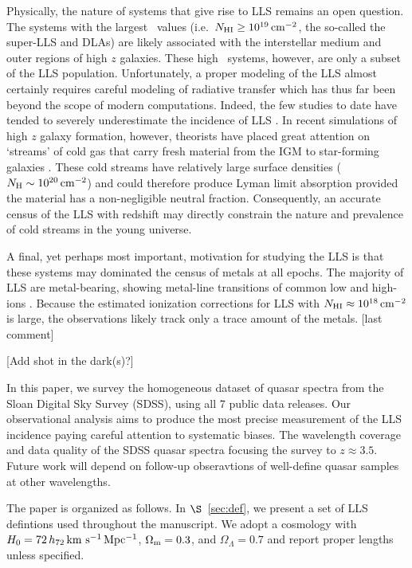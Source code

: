 \documentclass[12pt,preprint]{aastex}
\begin{document}
Physically, the nature of systems that give rise to LLS remains
an open question.  The systems with the largest \nhi\ values
(i.e.\ $N_{\rm HI} \ge 10^{19} \, {\rm cm^{-2}}$, the so-called the super-LLS and
DLAs) are likely associated with the interstellar medium and
outer regions of high $z$ galaxies.  These high \nhi\ systems, however,
are only a subset of the LLS population.  Unfortunately, a proper
modeling of the LLS almost certainly requires careful modeling of 
radiative transfer which has thus far been beyond the scope of
modern computations.  Indeed, the few studies to date have tended
to severely underestimate the incidence of LLS \citep{katz94,gardnerXX,gnedin}.
In recent simulations of high $z$ galaxy formation, however, 
theorists have placed great attention on `streams' of cold gas that
carry fresh material from the IGM to star-forming galaxies 
\citep{keres99,dekel08}.  These cold streams have relatively large
surface densities ($N_{\rm H} \sim 10^{20} \, {\rm cm^{-2}}$) and could therefore
produce Lyman limit absorption provided the material has a
non-negligible neutral fraction.  Consequently, an accurate census
of the LLS with redshift may directly constrain the nature and
prevalence of cold streams in the young universe.

A final, yet perhaps most important, motivation for studying the LLS
is that these systems may dominated the census of metals at all epochs.
The majority of LLS are metal-bearing, showing metal-line transitions of 
common low and high-ions \citep[e.g.][]{p99,pks2000}.
Because the estimated ionization corrections for LLS with 
$N_{\rm HI} \approx 10^{18} \, {\rm cm^{-2}}$ is large, the observations likely
track only a trace amount of the metals.  [last comment]
 
[Add shot in the dark(s)?]

In this paper, we survey the homogeneous dataset of quasar
spectra from the Sloan Digital Sky Survey (SDSS), using all 
7 public data releases.  Our observational analysis
aims to produce the most precise measurement of 
the LLS incidence paying careful attention to systematic
biases.  The wavelength coverage and data quality of the SDSS
quasar spectra focusing the survey to $z \approx 3.5$.  Future
work will depend on follow-up obseravtions of well-define
quasar samples at other wavelengths.

The paper is organized as follows.  In $\S$~\ref{sec:def},
we present a set of LLS defintions used throughout the manuscript.
We adopt a cosmology with 
$H_0 = 72 \, h_{72} \, {\rm km~s^{-1}} \, \rm Mpc^{-1}$, 
$\Omega_{\rm m} = 0.3$, and $\Omega_\Lambda = 0.7$
and report proper lengths unless specified.
\end{document}
